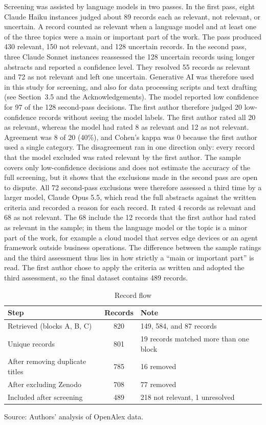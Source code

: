Screening was assisted by language models in two passes. In the first pass, eight Claude Haiku instances judged about 89 records each as relevant, not relevant, or uncertain. A record counted as relevant when a language model and at least one of the three topics were a main or important part of the work. The pass produced 430 relevant, 150 not relevant, and 128 uncertain records. In the second pass, three Claude Sonnet instances reassessed the 128 uncertain records using longer abstracts and reported a confidence level. They resolved 55 records as relevant and 72 as not relevant and left one uncertain. Generative AI was therefore used in this study for screening, and also for data processing scripts and text drafting (see Section~3.5 and the Acknowledgements). The model reported low confidence for 97 of the 128 second-pass decisions. The first author therefore judged 20 low-confidence records without seeing the model labels. The first author rated all 20 as relevant, whereas the model had rated 8 as relevant and 12 as not relevant. Agreement was 8 of 20 (40\%), and Cohen's kappa was 0 because the first author used a single category. The disagreement ran in one direction only: every record that the model excluded was rated relevant by the first author. The sample covers only low-confidence decisions and does not estimate the accuracy of the full screening, but it shows that the exclusions made in the second pass are open to dispute. All 72 second-pass exclusions were therefore assessed a third time by a larger model, Claude Opus 5.5, which read the full abstracts against the written criteria and recorded a reason for each record. It rated 4 records as relevant and 68 as not relevant. The 68 include the 12 records that the first author had rated as relevant in the sample; in them the language model or the topic is a minor part of the work, for example a cloud model that serves edge devices or an agent framework outside business operations. The difference between the sample ratings and the third assessment thus lies in how strictly a ``main or important part'' is read. The first author chose to apply the criteria as written and adopted the third assessment, so the final dataset contains 489 records.

\begin{table}[htbp]
\centering
\normalsize
\caption{Record flow}
\label{tab:flow}
\begin{tabularx}{\textwidth}{YcY}
\hline
\textbf{Step} & \textbf{Records} & \textbf{Note} \\ \hline
Retrieved (blocks A, B, C) & 820 & 149, 584, and 87 records \\
Unique records & 801 & 19 records matched more than one block \\
After removing duplicate titles & 785 & 16 removed \\
After excluding Zenodo & 708 & 77 removed \\
Included after screening & 489 & 218 not relevant, 1 unresolved \\ \hline
\end{tabularx}
\par\vspace{2pt}Source: Authors' analysis of OpenAlex data.
\end{table}

